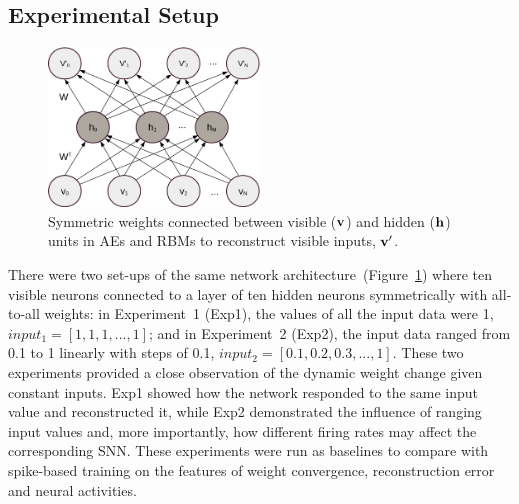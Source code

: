 \subsection{Experimental Setup}
\label{subsec:SNN_setup}
\begin{figure}
	\centering
	\includegraphics[width=0.5\textwidth]{pics_sdlm/AE.png}
	\caption[Reconstruction using AEs and RBMs.]{Symmetric weights connected between visible ($\bf{v}$) and hidden ($\bf{h}$) units in AEs and RBMs to reconstruct visible inputs, $\bf{v'}$.}
	\label{fig:sym_conn}
\end{figure}

There were two set-ups of the same network architecture~(Figure~\ref{fig:sym_conn}) where ten visible neurons connected to a layer of ten hidden neurons symmetrically with all-to-all weights: in Experiment~1 (Exp1), the values of all the input data were 1, $input_1 = [1, 1, 1,...,1]$; and in Experiment~2 (Exp2), the input data ranged from 0.1 to 1 linearly with steps of 0.1, $input_2 = [0.1, 0.2, 0.3,...,1]$.
These two experiments provided a close observation of the dynamic weight change given constant inputs.
Exp1 showed how the network responded to the same input value and reconstructed it, while Exp2 demonstrated the influence of ranging input values and, more importantly, how different firing rates may affect the corresponding SNN.
These experiments were run as baselines to compare with spike-based training on the features of weight convergence, reconstruction error and neural activities.


